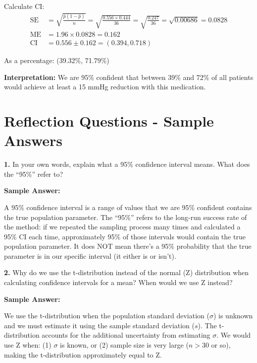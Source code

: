 \documentclass[11pt]{article}
\begin{document}
Calculate CI:
\begin{align*}
\text{SE} &= \sqrt{\frac{\hat{p}(1-\hat{p})}{n}} = \sqrt{\frac{0.556 \times 0.444}{36}} = \sqrt{\frac{0.247}{36}} = \sqrt{0.00686} = 0.0828\\
\text{ME} &= 1.96 \times 0.0828 = 0.162\\
\text{CI} &= 0.556 \pm 0.162 = (0.394, 0.718)
\end{align*}

As a percentage: (39.32\%, 71.79\%)

\textbf{Interpretation:} We are 95\% confident that between 39\% and 72\% of all patients would achieve at least a 15 mmHg reduction with this medication.

\newpage

\section*{Reflection Questions - Sample Answers}

\textbf{1.} In your own words, explain what a 95\% confidence interval means. What does the ``95\%'' refer to?

\textcolor{answergreen}{\textbf{Sample Answer:}}

A 95\% confidence interval is a range of values that we are 95\% confident contains the true population parameter. The ``95\%'' refers to the long-run success rate of the method: if we repeated the sampling process many times and calculated a 95\% CI each time, approximately 95\% of those intervals would contain the true population parameter. It does NOT mean there's a 95\% probability that the true parameter is in our specific interval (it either is or isn't).

\vspace{6pt}

\textbf{2.} Why do we use the t-distribution instead of the normal (Z) distribution when calculating confidence intervals for a mean? When would we use Z instead?

\textcolor{answergreen}{\textbf{Sample Answer:}}

We use the t-distribution when the population standard deviation ($\sigma$) is unknown and we must estimate it using the sample standard deviation ($s$). The t-distribution accounts for the additional uncertainty from estimating $\sigma$. We would use Z when: (1) $\sigma$ is known, or (2) sample size is very large ($n > 30$ or so), making the t-distribution approximately equal to Z.
\end{document}
